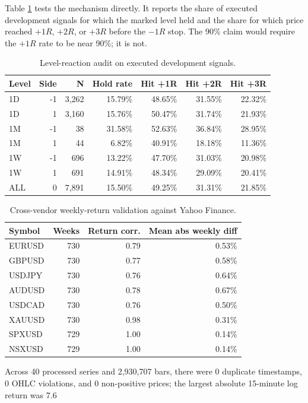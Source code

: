\documentclass[11pt,a4paper]{article}
\begin{document}
Table \ref{tab:reactions} tests the mechanism directly. It reports the share of executed development signals for which the marked level held and the share for which price reached $+1R$, $+2R$, or $+3R$ before the $-1R$ stop. The 90\% claim would require the $+1R$ rate to be near 90\%; it is not.
\begin{table}[htbp]
\centering
\small
\setlength{\tabcolsep}{4pt}
\caption{Level-reaction audit on executed development signals.}
\label{tab:reactions}
\begin{tabular}{lrrrrrr}
\toprule
Level & Side & N & Hold rate & Hit +1R & Hit +2R & Hit +3R \\
\midrule
1D & -1 & 3,262 & 15.79\% & 48.65\% & 31.55\% & 22.32\% \\
1D & 1 & 3,160 & 15.76\% & 50.47\% & 31.74\% & 21.93\% \\
1M & -1 & 38 & 31.58\% & 52.63\% & 36.84\% & 28.95\% \\
1M & 1 & 44 & 6.82\% & 40.91\% & 18.18\% & 11.36\% \\
1W & -1 & 696 & 13.22\% & 47.70\% & 31.03\% & 20.98\% \\
1W & 1 & 691 & 14.91\% & 48.34\% & 29.09\% & 20.41\% \\
ALL & 0 & 7,891 & 15.50\% & 49.25\% & 31.31\% & 21.85\% \\
\bottomrule
\end{tabular}
\end{table}
\begin{table}[htbp]
\centering
\small
\setlength{\tabcolsep}{4pt}
\caption{Cross-vendor weekly-return validation against Yahoo Finance.}
\label{tab:cross}
\begin{tabular}{lrrr}
\toprule
Symbol & Weeks & Return corr. & Mean abs weekly diff \\
\midrule
EURUSD & 730 & 0.79 & 0.53\% \\
GBPUSD & 730 & 0.77 & 0.58\% \\
USDJPY & 730 & 0.76 & 0.64\% \\
AUDUSD & 730 & 0.78 & 0.67\% \\
USDCAD & 730 & 0.76 & 0.50\% \\
XAUUSD & 730 & 0.98 & 0.31\% \\
SPXUSD & 729 & 1.00 & 0.14\% \\
NSXUSD & 729 & 1.00 & 0.14\% \\
\bottomrule
\end{tabular}
\end{table}
Across 40 processed series and 2,930,707 bars, there were 0 duplicate timestamps, 0 OHLC violations, and 0 non-positive prices; the largest absolute 15-minute log return was 7.6%
\end{document}
